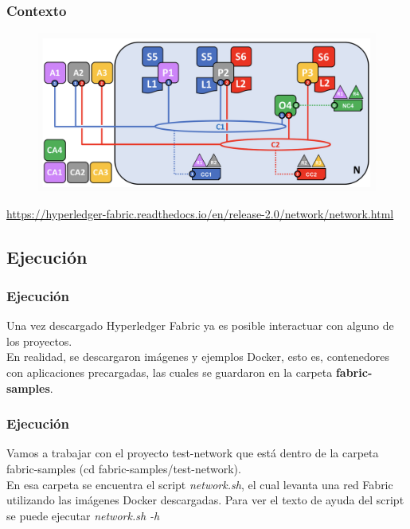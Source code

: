 \documentclass{beamer}
\begin{document}
	\begin{frame}
		\frametitle{Contexto}
		\begin{figure}[h]
			\includegraphics[scale=.4]{start_01}
			\centering
		\end{figure}
		\begin{center}
			\tiny{\url{https://hyperledger-fabric.readthedocs.io/en/release-2.0/network/network.html}}
		\end{center}
		
	\end{frame}
	
	\subsection{Ejecución}
	
	\begin{frame}
		\frametitle{Ejecución}
		Una vez descargado Hyperledger Fabric ya es posible interactuar con alguno de los proyectos.\\
		\vspace{4mm}
		En realidad, se descargaron imágenes y ejemplos Docker, esto es, contenedores con aplicaciones precargadas, las cuales se guardaron en la carpeta \textbf{fabric-samples}.
	\end{frame}

	\begin{frame}
		\frametitle{Ejecución}
		Vamos a trabajar con el proyecto test-network que está dentro de la carpeta fabric-samples (cd fabric-samples/test-network).\\
		\vspace{4mm}
		En esa carpeta se encuentra el script \textit{network.sh}, el cual levanta una red Fabric utilizando las imágenes Docker descargadas. Para ver el texto de ayuda del script se puede ejecutar \textit{network.sh -h}
	\end{frame}
	
\end{document}
